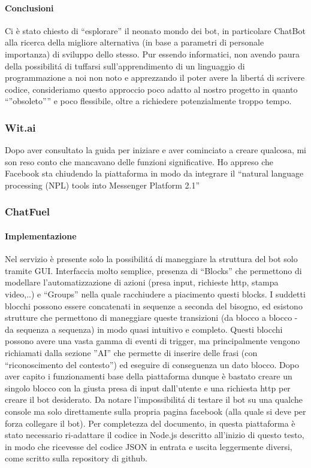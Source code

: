 \documentclass[]{article}
\begin{document}
\paragraph{Conclusioni}
 Ci è stato chiesto di “esplorare” il neonato mondo dei bot, in particolare ChatBot alla ricerca della migliore alternativa (in base a parametri di personale importanza) di sviluppo dello stesso. Pur essendo informatici, non avendo paura della possibilitá di tuffarsi sull’apprendimento di un linguaggio di programmazione a noi non noto e apprezzando il poter avere la libertá di scrivere codice, consideriamo questo approccio poco adatto al nostro progetto in quanto “”obsoleto”” e poco flessibile, oltre a richiedere potenzialmente troppo tempo.
 
\subsubsection{Wit.ai}
Dopo aver consultato la guida per iniziare e aver cominciato a creare qualcosa, mi son reso conto che mancavano delle funzioni significative. Ho appreso che Facebook sta chiudendo la piattaforma in modo da integrare il “natural language processing (NPL)  tools into Messenger Platform 2.1”

\subsubsection{ChatFuel}
\paragraph{Implementazione}
Nel servizio è presente solo la possibilitá di maneggiare la struttura del bot solo tramite GUI. Interfaccia molto semplice, presenza di “Blocks” che permettono di modellare l’automatizzazione di azioni (presa input, richieste http, stampa video,..) e “Groups” nella quale racchiudere a piacimento questi blocks. I suddetti blocchi possono essere concatenati in sequenze a seconda del bisogno, ed esistono strutture che permettono di maneggiare queste transizioni (da blocco a blocco - da sequenza a sequenza) in modo quasi intuitivo e completo. Questi blocchi possono avere una vasta gamma di eventi di trigger, ma principalmente vengono richiamati dalla sezione ”AI” che permette di inserire delle frasi (con “riconoscimento del contesto”)  ed eseguire di conseguenza un dato blocco. Dopo aver capito i funzionamenti base della piattaforma dunque è bastato creare un singolo blocco con la giusta presa di input dall’utente e una richiesta http per creare il bot desiderato. Da notare l’impossibilitá di testare il bot su una qualche console ma solo direttamente sulla propria pagina facebook (alla quale si deve per forza collegare il bot). Per completezza del documento, in questa piattaforma è stato necessario ri-adattare il codice in Node.js descritto all’inizio di questo testo, in modo che ricevesse del codice JSON in entrata e uscita leggermente diversi, come scritto sulla repository di github.
\end{document}
